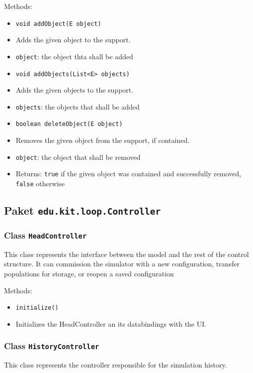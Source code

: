 \documentclass[parskip=full,11pt]{scrartcl}
\begin{document}
Methods:
\begin{itemize}\itemsep -10pt
\item \texttt{void addObject(E object)}
\item[] Adds the given object to the support.
\item[] \texttt{object}: the object thta shall be added

\item \texttt{void addObjects(List<E> objects)}
\item[] Adds the given objects to the support.
\item[] \texttt{objects}: the objects that shall be added

\item \texttt{boolean deleteObject(E object)}
\item[] Removes the given object from the support, if contained.
\item[] \texttt{object}: the object that shall be removed
\item[] Returns: \texttt{true} if the given object was contained and successfully removed, \texttt{false} otherwise
\end{itemize}

\subsection{Paket \texttt{edu.kit.loop.Controller}}

\subsubsection{Class \texttt{HeadController}}
This class represents the interface between the model and the rest of the control structure. It can commission the simulator with a new configuration, transfer populations for storage, or reopen a saved configuration

Methods:
\begin{itemize}\itemsep -10pt
\item \texttt{initialize()}
\item[] Initializes the HeadController an its databindings with the UI.
\end{itemize}

\subsubsection{Class \texttt{HistoryController}}
This class represents the controller responsible for the simulation history.
\end{document}
